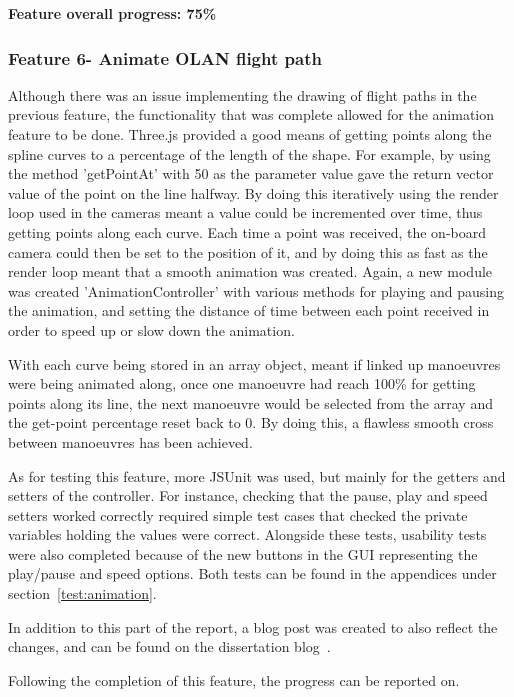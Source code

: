 \textbf{Feature overall progress: 75\%}

\subsubsection{Feature 6- Animate OLAN flight path}
Although there was an issue implementing the drawing of flight paths in the previous feature, the functionality that was complete allowed for the animation feature to be done. Three.js provided a good means of getting points along the spline curves to a percentage of the length of the shape. For example, by using the method 'getPointAt' with 50 as the parameter value gave the return vector value of the point on the line halfway. By doing this iteratively using the render loop used in the cameras meant a value could be incremented over time, thus getting points along each curve. Each time a point was received, the on-board camera could then be set to the position of it, and by doing this as fast as the render loop meant that a smooth animation was created. Again, a new module was created 'AnimationController' with various methods for playing and pausing the animation, and setting the distance of time between each point received in order to speed up or slow down the animation.

With each curve being stored in an array object, meant if linked up manoeuvres were being animated along, once one manoeuvre had reach 100\% for getting points along its line, the next manoeuvre would be selected from the array and the get-point percentage reset back to 0. By doing this, a flawless smooth cross between manoeuvres has been achieved.

As for testing this feature, more JSUnit was used, but mainly for the getters and setters of the controller. For instance, checking that the pause, play and speed setters worked correctly required simple test cases that checked the private variables holding the values were correct. Alongside these tests, usability tests were also completed because of the new buttons in the GUI representing the play/pause and speed options. Both tests can be found in the appendices under section~\ref{test:animation}. 

In addition to this part of the report, a blog post was created to also reflect the changes, and can be found on the dissertation blog~\cite{blogPost}.

Following the completion of this feature, the progress can be reported on. 

